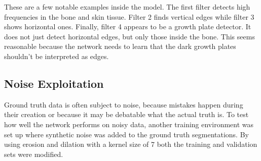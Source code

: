 These are a few notable examples inside the model. The first filter detects high frequencies in the bone and skin tissue. Filter 2 finds vertical edges while filter 3 shows horizontal ones. Finally, filter 4 appears to be a growth plate detector. It does not just detect horizontal edges, but only those inside the bone. This seems reasonable because the network needs to learn that the dark growth plates shouldn't be interpreted as edges.

\subsection{Noise Exploitation}

Ground truth data is often subject to noise, because mistakes happen during their creation or because it may be debatable what the actual truth is. To test how well the network performs on noisy data, another training environment was set up where synthetic noise was added to the ground truth segmentations. By using erosion and dilation with a kernel size of 7 both the training and validation sets were modified.

